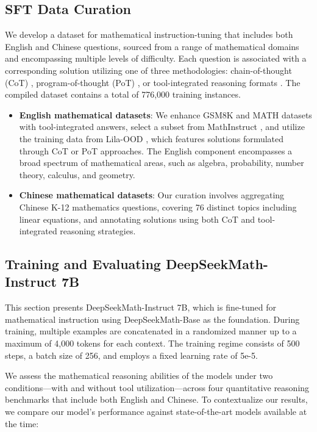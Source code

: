 \subsection{SFT Data Curation}

We develop a dataset for mathematical instruction-tuning that includes both English and Chinese questions, sourced from a range of mathematical domains and encompassing multiple levels of difficulty. Each question is associated with a corresponding solution utilizing one of three methodologies: chain-of-thought (CoT) \citep{cot}, program-of-thought (PoT) \citep{pot,pal}, or tool-integrated reasoning formats \citep{tora}. The compiled dataset contains a total of 776,000 training instances.

\begin{itemize}[topsep=0pt]
    \item \textbf{English mathematical datasets}: We enhance GSM8K and MATH datasets with tool-integrated answers, select a subset from MathInstruct \citep{MathInstruct}, and utilize the training data from Lila-OOD \citep{lila}, which features solutions formulated through CoT or PoT approaches. The English component encompasses a broad spectrum of mathematical areas, such as algebra, probability, number theory, calculus, and geometry.
    \item \textbf{Chinese mathematical datasets}: Our curation involves aggregating Chinese K-12 mathematics questions, covering 76 distinct topics including linear equations, and annotating solutions using both CoT and tool-integrated reasoning strategies.
\end{itemize}

\subsection{Training and Evaluating DeepSeekMath-Instruct 7B}

This section presents DeepSeekMath-Instruct 7B, which is fine-tuned for mathematical instruction using DeepSeekMath-Base as the foundation. During training, multiple examples are concatenated in a randomized manner up to a maximum of 4,000 tokens for each context. The training regime consists of 500 steps, a batch size of 256, and employs a fixed learning rate of 5e-5.

We assess the mathematical reasoning abilities of the models under two conditions—with and without tool utilization—across four quantitative reasoning benchmarks that include both English and Chinese. To contextualize our results, we compare our model's performance against state-of-the-art models available at the time:

